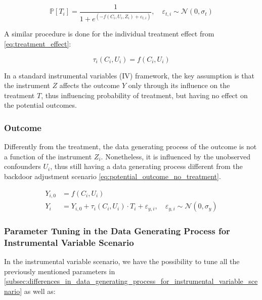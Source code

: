 \documentclass{article}
\numberwithin{equation}{section}
\begin{document}
\begin{equation}
    \mathbb{P}[T_i] = \frac{1}{1 + e^{(-f(C_i, U_i, Z_i) + \varepsilon_{t, i})}},
    \quad \varepsilon_{t, i} \sim \mathcal{N}(0, \sigma_t)
    \label{eq:probability_of_treatment_instrumental_variable}
\end{equation}

A similar procedure is done for the individual treatment effect from \eqref{eq:treatment_effect}:

\begin{equation}
    \tau_i(C_i, U_i) = f(C_i, U_i)
    \label{eq:treatment_effect_instrumental_variable}
\end{equation}

In a standard instrumental variables (IV) framework, the key assumption is that the instrument $Z$ affects the outcome $Y$ only through its influence on the treatment $T$, thus influencing probability of treatment, but having no effect on the potential outcomes.

\subsubsection{Outcome}

Differently from the treatment, the data generating process of the outcome is not a function of the instrument $Z_i$. Nonetheless, it is influenced by the unobserved confounders $U_i$, thus still having a data generating process different from the backdoor adjustment scenario \eqref{eq:potential_outcome_no_treatment}.

\begin{align}
    Y_{i, 0} &= f(C_i, U_i) \\
    Y_i &= Y_{i, 0} + \tau_i(C_i, U_i) \cdot T_i + \varepsilon_{y, i}, \quad \varepsilon_{y, i} \sim \mathcal{N}(0, \sigma_{y})
\end{align}

\subsubsection{Parameter Tuning in the Data Generating Process for Instrumental Variable Scenario}
\label{subsubsec:parameter_tuning_in_the_data_generating_process_instrumental_variable}

In the instrumental variable scenario, we have the possibility to tune all the previously mentioned parameters in \eqref{subsec:differences_in_data_generating_process_for_instrumental_variable_scenario} as well as:
\end{document}
